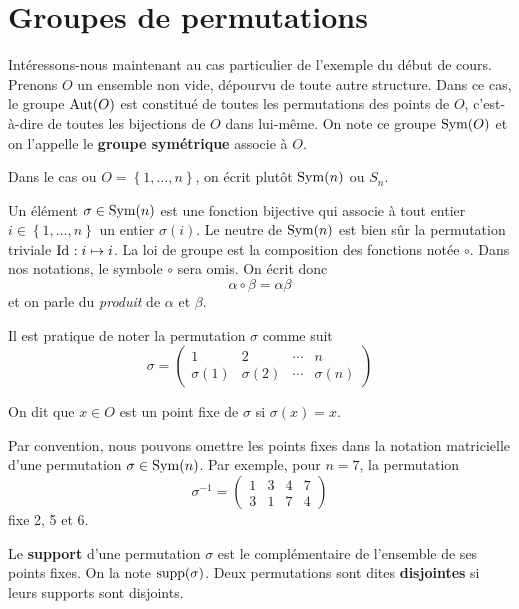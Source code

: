 \documentclass[french]{book}
\begin{document}
\section{Groupes de permutations}
Intéressons-nous maintenant au cas particulier de l'exemple du début de cours. Prenons $O$ un ensemble non vide, dépourvu de toute autre structure. Dans ce cas, le groupe $\operatorname{Aut}(O)$ est constitué de toutes les permutations des points de $O$, c'est-à-dire de toutes les bijections de $O$ dans lui-même. On note ce groupe $\operatorname{Sym}(O)$ et on l'appelle le \textbf{groupe symétrique} associe à $O$. 
\par Dans le cas ou $O = \left\{ 1, \dots, n \right\}$, on écrit plutôt $\operatorname{Sym}(n)$ ou $S_n$.
\par Un élément $\sigma \in \operatorname{Sym}(n)$ est une fonction bijective qui associe à tout entier $i \in \left\{ 1, \dots, n \right\}$ un entier $\sigma(i)$. Le neutre de $\operatorname{Sym}(n)$ est bien sûr la permutation triviale $\mathrm{Id_{}}: i \mapsto i$. La loi de groupe est la composition des fonctions notée $\circ$. Dans nos notations, le symbole $\circ$ sera omis. On écrit donc $$\alpha \circ \beta = \alpha \beta$$ et on parle du \textit{produit} de $\alpha$ et $\beta$.
\par Il est pratique de noter la permutation $\sigma$ comme suit
$$ \sigma = \begin{pmatrix}
  1 & 2 & \cdots & n \\
  \sigma(1) & \sigma(2) & \cdots & \sigma(n)
\end{pmatrix} $$
\begin{definition}
  On dit que $x \in O$ est un point fixe de $\sigma$ si $\sigma(x) = x$.
\end{definition}
Par convention, nous pouvons omettre les points fixes dans la notation matricielle d'une permutation $\sigma \in \operatorname{Sym}(n)$. Par exemple, pour $n=7$, la permutation
$$\sigma^{-1} = \begin{pmatrix}
1 & 3 & 4 & 7 \\
3 & 1 & 7 & 4
\end{pmatrix}$$
fixe 2, 5 et 6.
\begin{definition}
  Le \textbf{support} d'une permutation $\sigma$ est le complémentaire de l'ensemble de ses points fixes. On la note $\operatorname{supp}(\sigma)$. Deux permutations sont dites \textbf{disjointes} si leurs supports sont disjoints.
\end{definition}
\end{document}
